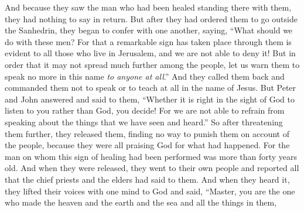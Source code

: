 \begin{biblechapter}
\verse And because they saw the man who had been healed standing there with them, they had nothing to say in return.
\verse But after they had ordered them to go outside the Sanhedrin, they began to confer with one another,
\verse saying, “What should we do with these men? For that a remarkable sign has taken place through them is evident to all those who live in Jerusalem, and we are not able to deny it!
\verse But in order that it may not spread much further among the people, let us warn them to speak no more in this name \textit{to anyone at all}.”
\verse And they called them back and commanded them not to speak or to teach at all in the name of Jesus.
\verse But Peter and John answered and said to them, “Whether it is right in the sight of God to listen to you rather than God, you decide!
\verse For we are not able to refrain from speaking about the things that we have seen and heard.”
\verse So after threatening them further, they released them, finding no way to punish them on account of the people, because they were all praising God for what had happened.
\verse For the man on whom this sign of healing had been performed was more than forty years old.
 And when they were released, they went to their own people and reported all that the chief priests and the elders had said to them.
\verse And when they heard it, they lifted their voices with one mind to God and said, “Master, you are the one who made the heaven and the earth and the sea and all the things in them,

\end{biblechapter}
